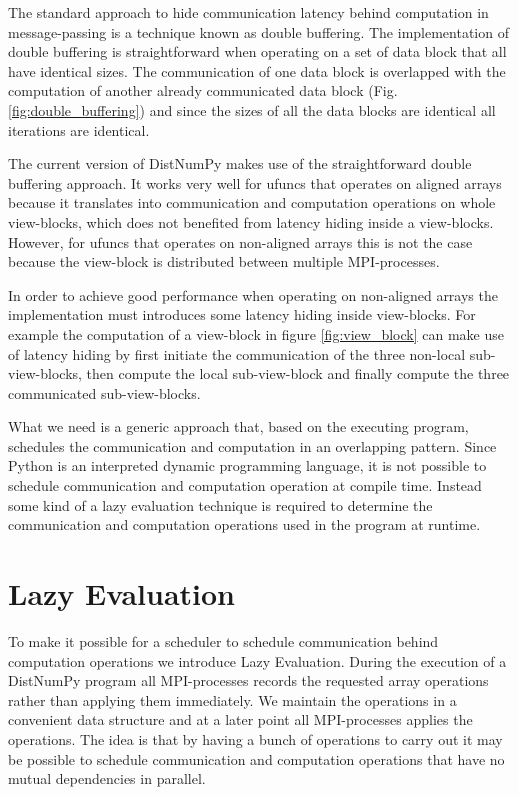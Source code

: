 \documentclass{acm_proc_article-sp}
\begin{document}
The standard approach to hide communication latency behind computation in message-passing is a technique known as double buffering. The implementation of double buffering is straightforward when operating on a set of data block that all have identical sizes. The communication of one data block is overlapped with the computation of another already communicated data block (Fig. \ref{fig:double_buffering}) and since the sizes of all the data blocks are identical all iterations are identical.

The current version of DistNumPy makes use of the straightforward double buffering approach. It works very well for ufuncs that operates on aligned arrays because it translates into communication and computation operations on whole view-blocks, which does not benefited from latency hiding inside a view-blocks. However, for ufuncs that operates on non-aligned arrays this is not the case because the view-block is distributed between multiple MPI-processes. 

In order to achieve good performance when operating on non-aligned arrays the implementation must introduces some latency hiding inside view-blocks. For example the computation of a view-block in figure \ref{fig:view_block} can make use of latency hiding by first initiate the communication of the three non-local sub-view-blocks, then compute the local sub-view-block and finally compute the three communicated sub-view-blocks. 

What we need is a generic approach that, based on the executing program, schedules the communication and computation in an overlapping pattern. Since Python is an interpreted dynamic programming language, it is not possible to schedule communication and computation operation at compile time. Instead some kind of a lazy evaluation technique is required to determine the communication and computation operations used in the program at runtime.


\section{Lazy Evaluation}
To make it possible for a scheduler to schedule communication behind computation operations we introduce Lazy Evaluation. During the execution of a DistNumPy program all MPI-processes records the requested array operations rather than applying them immediately. We maintain the operations in a convenient data structure and at a later point all MPI-processes applies the operations. The idea is that by having a bunch of operations to carry out it may be possible to schedule communication and computation operations that have no mutual dependencies in parallel.
\end{document}
